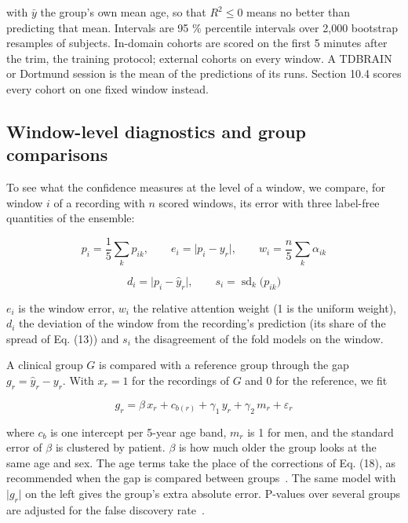 \documentclass[11pt,a4paper]{article}
\begin{document}
with $\bar y$ the group's own mean age, so that $R^2 \le 0$ means no better than predicting that mean. Intervals are 95 \% percentile intervals over 2,000 bootstrap resamples of subjects. In-domain cohorts are scored on the first 5 minutes after the trim, the training protocol; external cohorts on every window. A TDBRAIN or Dortmund session is the mean of the predictions of its runs. Section 10.4 scores every cohort on one fixed window instead.

\subsection{Window-level diagnostics and group comparisons}

To see what the confidence measures at the level of a window, we compare, for window $i$ of a recording with $n$ scored windows, its error with three label-free quantities of the ensemble:

\begin{equation}
p_i = \frac{1}{5}\sum_k p_{ik}, \qquad e_i = \lvert p_i - y_r \rvert, \qquad w_i = \frac{n}{5}\sum_k \alpha_{ik} \tag{20}
\end{equation}

\begin{equation}
d_i = \lvert p_i - \hat y_r \rvert, \qquad s_i = \operatorname{sd}_k\big( p_{ik} \big) \tag{21}
\end{equation}

$e_i$ is the window error, $w_i$ the relative attention weight (1 is the uniform weight), $d_i$ the deviation of the window from the recording's prediction (its share of the spread of Eq. (13)) and $s_i$ the disagreement of the fold models on the window.

A clinical group $G$ is compared with a reference group through the gap $g_r = \hat y_r - y_r$. With $x_r = 1$ for the recordings of $G$ and 0 for the reference, we fit

\begin{equation}
g_r = \beta\,x_r + c_{b(r)} + \gamma_1\,y_r + \gamma_2\,m_r + \varepsilon_r \tag{22}
\end{equation}

where $c_b$ is one intercept per 5-year age band, $m_r$ is 1 for men, and the standard error of $\beta$ is clustered by patient. $\beta$ is how much older the group looks at the same age and sex. The age terms take the place of the corrections of Eq. (18), as recommended when the gap is compared between groups~\citep{delange2020commentary}. The same model with $\lvert g_r \rvert$ on the left gives the group's extra absolute error. P-values over several groups are adjusted for the false discovery rate~\citep{benjamini1995fdr}.
\end{document}
